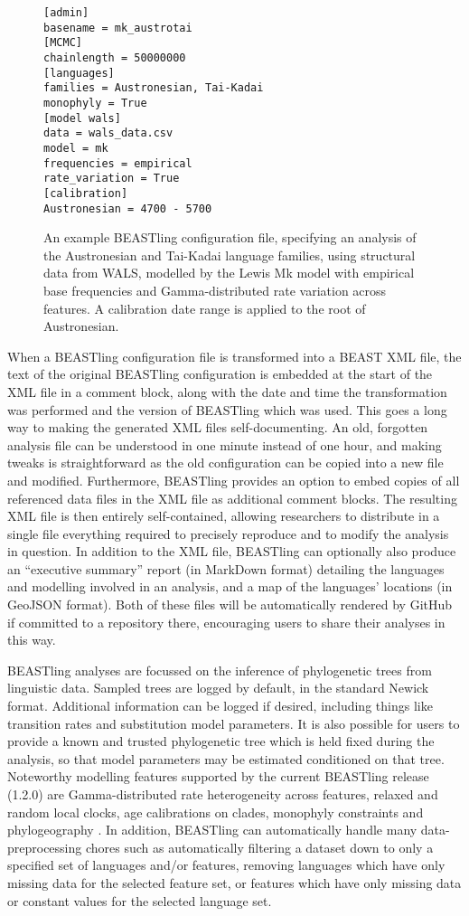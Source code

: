 \documentclass[twocolumn,10pt]{scrartcl}
\begin{document}
\begin{figure}[t]
	\begin{verbatim}[admin]
basename = mk_austrotai
[MCMC]
chainlength = 50000000
[languages]
families = Austronesian, Tai-Kadai
monophyly = True
[model wals]
data = wals_data.csv
model = mk
frequencies = empirical
rate_variation = True
[calibration]
Austronesian = 4700 - 5700\end{verbatim}
	\caption{An example BEASTling configuration file, specifying an analysis of the Austronesian and Tai-Kadai language families, using structural data from WALS, modelled by the Lewis Mk model with empirical base frequencies and Gamma-distributed rate variation across features.  A calibration date range is applied to the root of Austronesian.}
\label{fig:config}
\end{figure}

When a BEASTling configuration file is transformed into a BEAST XML file, the text of the original BEASTling configuration is embedded at the start of the XML file in a comment block, along with the date and time the transformation was performed and the version of BEASTling which was used.  This goes a long way to making the generated XML files self-documenting.  An old, forgotten analysis file can be understood in one minute instead of one hour, and making tweaks is straightforward as the old configuration can be copied into a new file and modified.  Furthermore, BEASTling provides an option to embed copies of all referenced data files in the XML file as additional comment blocks.  The resulting XML file is then entirely self-contained, allowing researchers to distribute in a single file everything required to precisely reproduce and to modify the analysis in question.  In addition to the XML file, BEASTling can optionally also produce an ``executive summary'' report (in MarkDown format) detailing the languages and modelling involved in an analysis, and a map of the languages' locations (in GeoJSON format).  Both of these files will be automatically rendered by GitHub if committed to a repository there, encouraging users to share their analyses in this way. 

BEASTling analyses are focussed on the inference of phylogenetic trees from linguistic data.  Sampled trees are logged by default, in the standard Newick format.  Additional information can be logged if desired, including things like transition rates and substitution model parameters.  It is also possible for users to provide a known and trusted phylogenetic tree which is held fixed during the analysis, so that model parameters may be estimated conditioned on that tree.  Noteworthy modelling features supported by the current BEASTling release (1.2.0) are Gamma-distributed rate heterogeneity across features, relaxed and random local clocks, age calibrations on clades, monophyly constraints and phylogeography .  In addition, BEASTling can automatically handle many data-preprocessing chores such as automatically filtering a dataset down to only a specified set of languages and/or features, removing languages which have only missing data for the selected feature set, or features which have only missing data or constant values for the selected language set.
\end{document}
